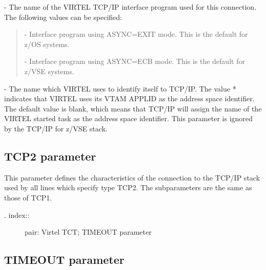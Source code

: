 \documentclass[letterpaper,10pt,english]{sphinxmanual}
\begin{document}
 - The name of the VIRTEL TCP/IP interface program used for this connection. The following values can be specified:
\begin{quote}

 - Interface program using ASYNC=EXIT mode. This is the default for z/OS systems.

 - Interface program using ASYNC=ECB mode. This is the default for z/VSE systems.
\end{quote}

 - The name which VIRTEL uses to identify itself to TCP/IP. The value * indicates that VIRTEL uses its VTAM APPLID as the address space identifier. The default value is blank, which means that TCP/IP will assign the name of the VIRTEL started task as the address space identifier. This parameter is ignored by the TCP/IP for z/VSE stack.


\subsection{TCP2 parameter}
\label{\detokenize{Installation_Guide:tcp2-parameter}}
\begin{sphinxVerbatim}[commandchars=\\\{\}]
    
\PYG{p}{[}\PYG{p}{]}\PYG{p}{[}\PYG{p}{]}\PYG{p}{[}\PYG{p}{]}\PYG{p}{[}\PYG{p}{]}
\end{sphinxVerbatim}

This parameter defines the characteristics of the connection to the TCP/IP stack used by all lines which specify type TCP2. The subparameters are the same as those of TCP1.
\begin{description}
\item[{. index::}] \leavevmode
pair: Virtel TCT; TIMEOUT parameter

\end{description}


\subsection{TIMEOUT parameter}
\label{\detokenize{Installation_Guide:timeout-parameter}}
\begin{sphinxVerbatim}[commandchars=\\\{\}]
 
\end{sphinxVerbatim}
\end{document}
